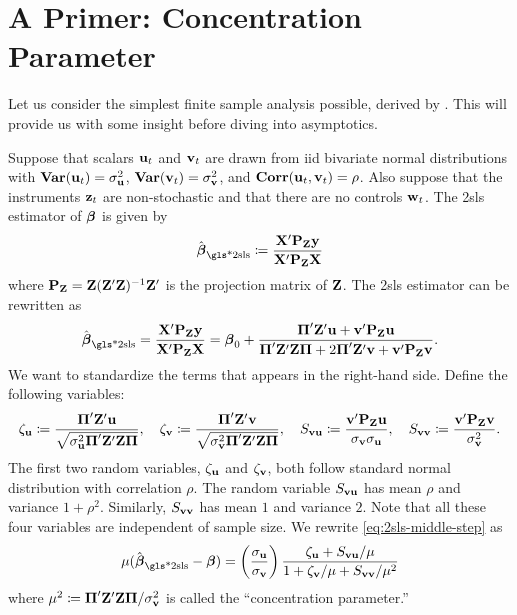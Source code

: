 \documentclass[a4paper]{article}
\begin{document}

\section{A Primer: Concentration Parameter}

Let us consider the simplest finite sample analysis possible, derived by \textcite{rothenberg-1984}.
This will provide us with some insight before diving into asymptotics.

Suppose that scalars $\mathbf{u}_t$ and $\mathbf{v}_t$ are drawn from \gls*{iid} bivariate normal distributions
with $\operatorname{\text{\textrm{\upshape\textbf{Var}}}}(\mathbf{u}_t)=\sigma_{\mathbf{u}}^2$, $\operatorname{\text{\textrm{\upshape\textbf{Var}}}}(\mathbf{v}_t)=\sigma_{\mathbf{v}}^2$, and $\operatorname{\text{\textrm{\upshape\textbf{Corr}}}}(\mathbf{u}_t,\mathbf{v}_t)=\rho$.
Also suppose that the instruments $\mathbf{z}_t$ are non-stochastic and that there are no controls $\mathbf{w}_t$.
The \gls*{2sls} estimator of $\boldsymbol{\beta}$ is given by
\begin{align*}
	\hat\bbeta_{\text{\gls*{2sls}}}
	\coloneqq \frac{ \XX\T\PP_{\ZZ}\yy }{ \XX\T\PP_{\ZZ}\XX }
\end{align*}
where $\mathbf{P}_{\mathbf{Z}}=\mathbf{Z}(\mathbf{Z}'\mathbf{Z})^{-1}\mathbf{Z}'$ is the projection matrix of $\mathbf{Z}$.
The \gls*{2sls} estimator can be rewritten as
\begin{align}\label{eq:2sls-middle-step}
	\hat\bbeta_{\text{\gls*{2sls}}}
	= \frac{ \XX\T\PP_{\ZZ}\yy }{ \XX\T\PP_{\ZZ}\XX }
	= \bbeta_0 + \frac{ \PI\T\ZZ\T\uu + \vv\T\PP_{\ZZ}\uu }{ \PI\T\ZZ\T\ZZ\PI + 2\PI\T\ZZ\T\vv + \vv\T\PP_{\ZZ}\vv}.
\end{align}
We want to standardize the terms that appears in the right-hand side.
Define the following variables:
\begin{align*}
	\zeta_{\mathbf{u}} \coloneqq \frac{ \boldsymbol{\Pi}'\mathbf{Z}'\mathbf{u} }{ \sqrt{\sigma_{\mathbf{u}}^2\boldsymbol{\Pi}'\mathbf{Z}'\mathbf{Z}\boldsymbol{\Pi}} },\quad
	\zeta_{\mathbf{v}} \coloneqq \frac{ \boldsymbol{\Pi}'\mathbf{Z}'\mathbf{v} }{ \sqrt{\sigma_{\mathbf{v}}^2\boldsymbol{\Pi}'\mathbf{Z}'\mathbf{Z}\boldsymbol{\Pi}} },\quad
	S_{\mathbf{v}\mathbf{u}} \coloneqq \frac{ \mathbf{v}'\mathbf{P}_{\mathbf{Z}}\mathbf{u} }{ \sigma_{\mathbf{v}}\sigma_{\mathbf{u}} },\quad
	S_{\mathbf{v}\mathbf{v}} \coloneqq \frac{ \mathbf{v}'\mathbf{P}_{\mathbf{Z}}\mathbf{v} }{ \sigma_{\mathbf{v}}^2 }.
\end{align*}
The first two random variables,
$\zeta_{\mathbf{u}}$ and $\zeta_{\mathbf{v}}$,
both follow standard normal distribution with correlation $\rho$.
The random variable $S_{\mathbf{v}\mathbf{u}}$ has mean $\rho$ and variance $1+\rho^2$.
Similarly, $S_{\mathbf{v}\mathbf{v}}$ has mean $1$ and variance $2$.
Note that all these four variables are independent of sample size.
We rewrite \eqref{eq:2sls-middle-step} as
\begin{align}\label{eq:2sls-rothenberg}
	\mu( \hat\bbeta_{\text{\gls*{2sls}}} - \bbeta )
	=
	\left( \frac{ \sigma_{\uu} }{ \sigma_{\vv} } \right)
	\frac
	{ \zeta_{\uu} + S_{\vv\uu} / \mu }
	{ 1 + \zeta_{\vv}/\mu + S_{\vv\vv}/\mu^2 }
\end{align}
where $\mu^2 \coloneqq \boldsymbol{\Pi}'\mathbf{Z}'\mathbf{Z}\boldsymbol{\Pi}/\sigma_{\mathbf{v}}^2$ is called the ``concentration parameter.''
\end{document}
